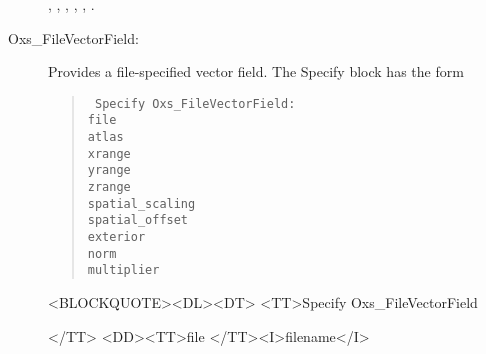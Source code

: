 \begin{description}
\begin{ExampleMifs}
  , ,
  , ,
  , .
\end{ExampleMifs}

%
\item[Oxs\_FileVectorField:\label{item:FileVectorField}]
   Provides a file-specified vector field.  The Specify block has the form
      \begin{latexonly}
      \begin{quote}\tt
      Specify Oxs\_FileVectorField: \ocb\\
       \bi file  \\
       \bi atlas \\
       \bi xrange \ocb{}\ccb\\
       \bi yrange \ocb{}\ccb\\
       \bi zrange \ocb{}\ccb\\
       \bi spatial\_scaling \ocb{}\ccb\\
       \bi spatial\_offset \ocb{}\ccb\\
       \bi exterior \\
       \bi norm  \\
       \bi multiplier \\
      \ccb
      \end{quote}
      \end{latexonly}
      \begin{rawhtml}
      <BLOCKQUOTE><DL><DT>
      <TT>Specify Oxs_FileVectorField {</TT>
      <DD><TT>file </TT><I>filename</I>

}
\end{rawhtml}
\end{description}
